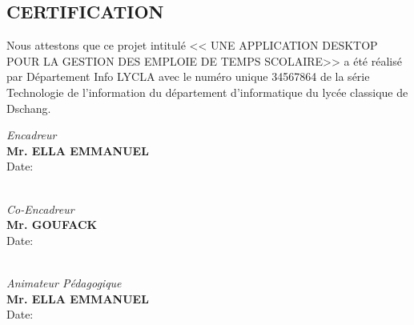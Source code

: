 \documentclass[english,12pt,a4paper]{report}
\begin{document}
\begin{spacing}{1.5}
\chapter*{CERTIFICATION}
\hspace{1.2cm}
Nous attestons que ce projet intitulé << UNE APPLICATION DESKTOP POUR LA GESTION DES EMPLOIE DE TEMPS SCOLAIRE>> a été réalisé par Département Info LYCLA avec le numéro unique 34567864 de la série Technologie de l'information du département d'informatique du lycée classique de Dschang.
\begin{center}
	\vspace{0.2cm}
	\emph{Encadreur}\\
	\vspace{0.2cm}
	\textbf{Mr. ELLA EMMANUEL}\\
	\vspace{0.2cm}
	Date:
	\\
	\vspace{0.2cm}
	\emph{Co-Encadreur}\\
	\vspace{0.2cm}
	\textbf{Mr. GOUFACK}\\
	\vspace{0.2cm}
	Date:
	\\
	\vspace{0.5cm}
	\emph{Animateur Pédagogique}\\
	\vspace{0.2cm}
	\textbf{Mr. ELLA EMMANUEL}\\
	\vspace{0.2cm}
	Date:
\end{center}

\end{spacing}
\end{document}
